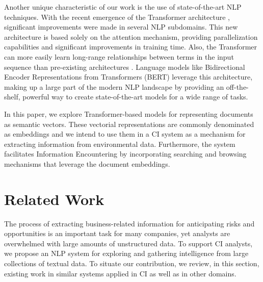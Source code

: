 \documentclass[a4paper]{article}
\begin{document}
Another unique characteristic of our work is the use of state-of-the-art NLP techniques. With the recent emergence of the Transformer architecture \citep{vaswani2017}, significant improvements were made in several NLP subdomains. This new architecture is based solely on the attention mechanism, providing parallelization capabilities and significant improvements in training time. Also, the Transformer can more easily learn long-range relationships between terms in the input sequence than pre-existing architectures \citep{vaswani2017}. Language models like Bidirectional Encoder Representations from Transformers (BERT) \citep{devlin2019} leverage this architecture, making up a large part of the modern NLP landscape by providing an off-the-shelf, powerful way to create state-of-the-art models for a wide range of tasks.

In this paper, we explore Transformer-based models for representing documents as semantic vectors. These vectorial representations are commonly denominated as embeddings and we intend to use them in a CI system as a mechanism for extracting information from environmental data. Furthermore, the system facilitates Information Encountering by incorporating searching and browsing mechanisms that leverage the document embeddings.

\section{Related Work}
The process of extracting business-related information for anticipating risks and opportunities is an important task for many companies, yet analysts are overwhelmed with large amounts of unstructured data. To support CI analysts, we propose an NLP system for exploring and gathering intelligence from large collections of textual data. To situate our contribution, we review, in this section, existing work in similar systems applied in CI as well as in other domains.
\end{document}
